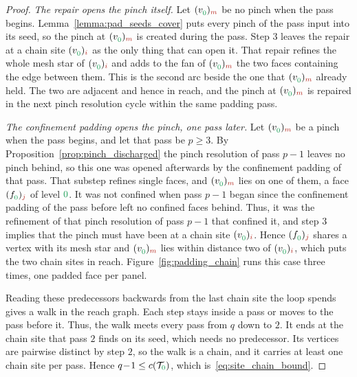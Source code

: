 \documentclass[a4paper, 12pt]{article}
\newcommand{\green}{\color{ForestGreen}}
\newcommand{\brickred}{\color{BrickRed}}
\newcommand{\T}{\mathcal{T}}
\newcommand{\vertex}[2]{\freeQ{v}{}{#1}{#2}}
\newcommand{\face}[2]{\freeQ{f}{}{#1}{#2}}
\newcommand{\coarseIdxone}{{\brickred i}}
\newcommand{\coarseIdxtwo}{{\brickred m}}
\newcommand{\fineIdxone}{{\brickred j}}
\newcommand{\lzero}{{\green 0}}
\newcommand{\freeQ}[4]{ ( {#1}^{#2}_{#3} )_{#4}}
\theoremstyle{definition}
\theoremstyle{plain}
\numberwithin{equation}{section}
\begin{document}
\begin{proof}
    \emph{The repair opens the pinch itself.} Let $\vertex{\lzero}{\coarseIdxtwo}$ be no pinch when the pass begins. Lemma~\ref{lemma:pad_seeds_cover} puts every pinch of the pass input into its seed, so the pinch at $\vertex{\lzero}{\coarseIdxtwo}$ is created during the pass. Step $3$ leaves the repair at a chain site $\vertex{\lzero}{\coarseIdxone}$ as the only thing that can open it. That repair refines the whole mesh star of $\vertex{\lzero}{\coarseIdxone}$ and adds to the fan of $\vertex{\lzero}{\coarseIdxtwo}$ the two faces containing the edge between them. This is the second arc beside the one that $\vertex{\lzero}{\coarseIdxtwo}$ already held. The two are adjacent and hence in reach, and the pinch at $\vertex{\lzero}{\coarseIdxtwo}$ is repaired in the next pinch resolution cycle within the same padding pass.

    \emph{The confinement padding opens the pinch, one pass later.} Let $\vertex{\lzero}{\coarseIdxtwo}$ be a pinch when the pass begins, and let that pass be $p \geq 3$. By Proposition~\ref{prop:pinch_discharged} the pinch resolution of pass $p \! - \! 1$ leaves no pinch behind, so this one was opened afterwards by the confinement padding of that pass. That substep refines single faces, and $\vertex{\lzero}{\coarseIdxtwo}$ lies on one of them, a face $\face{\lzero}{\fineIdxone}$ of level $\lzero$. It was not confined when pass $p \! - \! 1$ began since the confinement padding of the pass before left no confined faces behind. Thus, it was the refinement of that pinch resolution of pass $p \! - \!1$ that confined it, and step $3$ implies that the pinch must have been at a chain site $\vertex{\lzero}{\coarseIdxone}$. Hence $\face{\lzero}{\fineIdxone}$ shares a vertex with its mesh star and $\vertex{\lzero}{\coarseIdxtwo}$ lies within distance two of $\vertex{\lzero}{\coarseIdxone}$, which puts the two chain sites in reach. Figure~\ref{fig:padding_chain} runs this case three times, one padded face per panel.

    Reading these predecessors backwards from the last chain site the loop spends gives a walk in the reach graph. Each step stays inside a pass or moves to the pass before it. Thus, the walk meets every pass from $q$ down to $2$. It ends at the chain site that pass $2$ finds on its seed, which needs no predecessor. Its vertices are pairwise distinct by step $2$, so the walk is a chain, and it carries at least one chain site per pass. Hence $q \! - \! 1 \leq c(\T_\lzero)$, which is~\eqref{eq:site_chain_bound}.
\end{proof}
\end{document}
